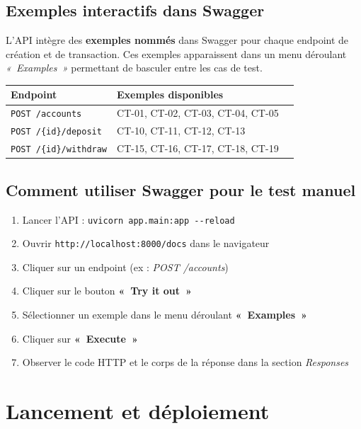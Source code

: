 \documentclass[12pt,a4paper]{article}
\begin{document}
\subsection{Exemples interactifs dans Swagger}

L'API intègre des \textbf{exemples nommés} dans Swagger pour chaque endpoint de création et de transaction. Ces exemples apparaissent dans un menu déroulant \textit{«~Examples~»} permettant de basculer entre les cas de test.

\begin{center}
\begin{tabular}{lll}
\toprule
\textbf{Endpoint} & \textbf{Exemples disponibles} \\
\midrule
\texttt{POST /accounts} & CT-01, CT-02, CT-03, CT-04, CT-05 \\
\texttt{POST /\{id\}/deposit} & CT-10, CT-11, CT-12, CT-13 \\
\texttt{POST /\{id\}/withdraw} & CT-15, CT-16, CT-17, CT-18, CT-19 \\
\bottomrule
\end{tabular}
\end{center}

\subsection{Comment utiliser Swagger pour le test manuel}

\begin{enumerate}
  \item Lancer l'API : \texttt{uvicorn app.main:app -{}-reload}
  \item Ouvrir \texttt{http://localhost:8000/docs} dans le navigateur
  \item Cliquer sur un endpoint (ex : \textit{POST /accounts})
  \item Cliquer sur le bouton \textbf{«~Try it out~»}
  \item Sélectionner un exemple dans le menu déroulant \textbf{«~Examples~»}
  \item Cliquer sur \textbf{«~Execute~»}
  \item Observer le code HTTP et le corps de la réponse dans la section \textit{Responses}
\end{enumerate}

\section{Lancement et déploiement}
\end{document}
